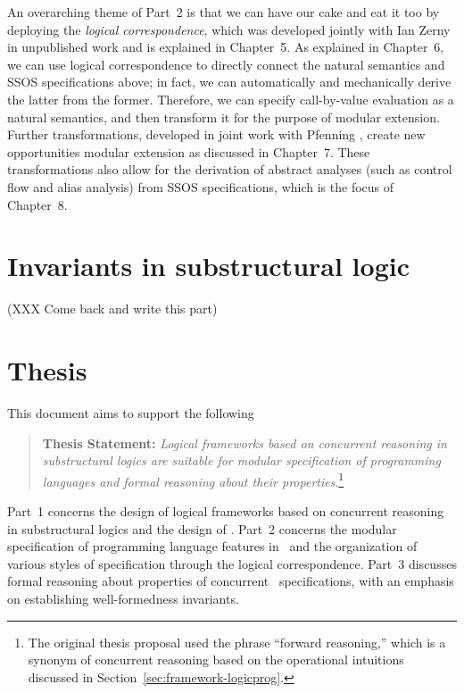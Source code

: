 An overarching theme of Part~2 is that we can have our cake and eat it
too by deploying the {\it logical correspondence}, which was developed
jointly with Ian Zerny in unpublished work and is explained in
Chapter~5. As explained in Chapter~6, we can use logical
correspondence to directly connect the natural semantics and SSOS
specifications above; in fact, we can automatically and mechanically
derive the latter from the former. Therefore, we can specify
call-by-value evaluation as a natural semantics, and then transform it
for the purpose of modular extension. Further transformations,
developed in joint work with Pfenning \cite{simmons11logical}, create
new opportunities modular extension as discussed in Chapter~7. These
transformations also allow for the derivation of abstract analyses
(such as control flow and alias analysis) from SSOS specifications,
which is the focus of Chapter~8.

\section{Invariants in substructural logic}

(XXX Come back and write this part)

\section{Thesis}

This document aims to support the following

\begin{quote} {\bf Thesis Statement:} {\it Logical frameworks based on
    concurrent reasoning in substructural logics are suitable for
    modular specification of programming languages and formal
    reasoning about their properties}.\footnote{The original thesis
    proposal used the phrase ``forward reasoning,'' which is a synonym
    of concurrent reasoning based on the operational intuitions
    discussed in Section~\ref{sec:framework-logicprog}.}
\end{quote}

\noindent
Part~1 concerns the design of logical frameworks based on concurrent
reasoning in substructural logics and the design of \sls. Part~2
concerns the modular specification of programming language features in
\sls~and the organization of various styles of specification through
the logical correspondence. Part~3 discusses formal reasoning about
properties of concurrent \sls~specifications, with an emphasis on
establishing well-formedness invariants.
